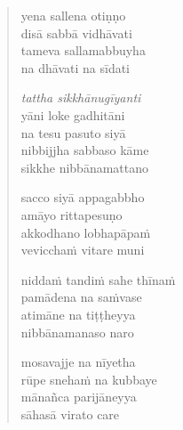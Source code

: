 
\clearpage
\begin{verse}

yena sallena otiṇṇo\\
disā sabbā vidhāvati\\
tameva sallamabbuyha\\
na dhāvati na sīdati

\emph{tattha sikkhānugīyanti}\\
yāni loke gadhitāni\\
na tesu pasuto siyā\\
nibbijjha sabbaso kāme\\
sikkhe nibbānamattano

sacco siyā appagabbho\\
amāyo rittapesuṇo\\
akkodhano lobhapāpaṁ\\
vevicchaṁ vitare muni

niddaṁ tandiṁ sahe thīnaṁ\\
pamādena na saṁvase\\
atimāne na tiṭṭheyya\\
nibbānamanaso naro

mosavajje na nīyetha\\
rūpe snehaṁ na kubbaye\\
mānañca parijāneyya\\
sāhasā virato care

\end{verse}


